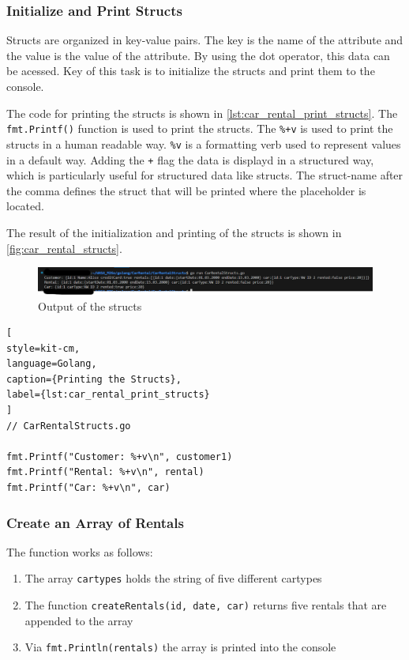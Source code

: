 \subsubsection*{Initialize and Print Structs}
Structs are organized in key-value pairs.
The key is the name of the attribute and the value is the value of the attribute.
By using the dot operator, this data can be acessed.
Key of this task is to initialize the structs and print them to the console.

The code for printing the structs is shown in \autoref{lst:car_rental_print_structs}.
The \texttt{fmt.Printf()} function is used to print the structs.
The \texttt{\%+v} is used to print the structs in a human readable way.
\texttt{\%v} is a formatting verb used to represent values in a default way.
Adding the \texttt{+} flag the data is displayd in a structured way, which is particularly useful for structured data like structs.
The struct-name after the comma defines the struct that will be printed where the placeholder is located.

The result of the initialization and printing of the structs is shown in \autoref{fig:car_rental_structs}.
\begin{figure}[H]
    \centering
    \includegraphics[width=\textwidth]{figures/goLang/carRental/carRental_structs.png}
    \caption{Output of the structs}
    \label{fig:car_rental_structs}
\end{figure}

\begin{lstlisting}[
style=kit-cm,
language=Golang,
caption={Printing the Structs},
label={lst:car_rental_print_structs}
]
// CarRentalStructs.go

fmt.Printf("Customer: %+v\n", customer1)
fmt.Printf("Rental: %+v\n", rental)
fmt.Printf("Car: %+v\n", car)
\end{lstlisting}

\subsubsection*{Create an Array of Rentals}
The function works as follows:
\begin{enumerate}
    \item The array \texttt{cartypes} holds the string of five different cartypes
    \item The function \texttt{createRentals(id, date, car)} returns five rentals that are appended to the array
    \item Via \texttt{fmt.Println(rentals)} the array is printed into the console
\end{enumerate}

